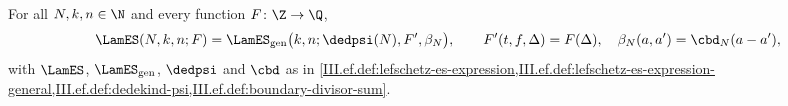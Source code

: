 For all $N,k,n\in\N$ and every function $F\colon\Z\to\Q$,
\[
  \LamES(N,k,n;F)=\LamES_{\mathrm{gen}}\bigl(k,n;\dedpsi(N),F',\beta_N\bigr),\qquad F'(t,f,\Delta)=F(\Delta),\quad\beta_N(a,a')=\cbd_N(a-a'),
\]
with $\LamES$, $\LamES_{\mathrm{gen}}$, $\dedpsi$ and $\cbd$ as in
\cref{III.ef.def:lefschetz-es-expression,III.ef.def:lefschetz-es-expression-general,III.ef.def:dedekind-psi,III.ef.def:boundary-divisor-sum}.
